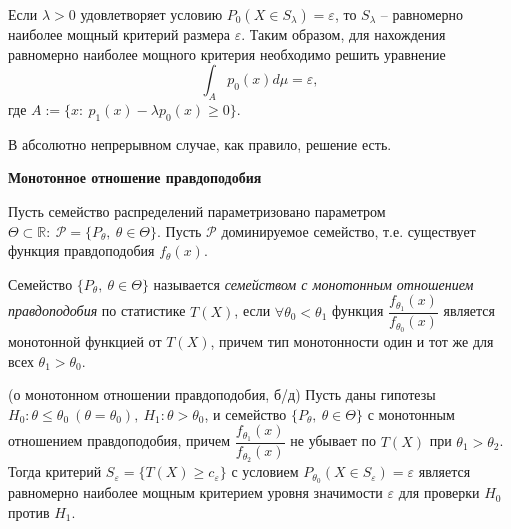 \begin{corollary}
    Если $\displaystyle \lambda  >0$ удовлетворяет условию $\displaystyle P_{0}( X\in S_{\lambda }) =\varepsilon $, то $\displaystyle S_{\lambda }$ -- равномерно наиболее мощный критерий размера $\displaystyle \varepsilon $. Таким образом, для нахождения равномерно наиболее мощного критерия необходимо решить уравнение
    \begin{equation*}
        \int _{A} p_{0}( x) d\mu =\varepsilon ,
    \end{equation*}
    где $\displaystyle A:=\{x:\ p_{1}( x) -\lambda p_{0}( x) \geqslant 0\}$.
\end{corollary}
\begin{note}
    В абсолютно непрерывном случае, как правило, решение есть.
\end{note}


\textbf{Монотонное отношение правдоподобия}


Пусть семейство распределений параметризовано параметром $\displaystyle \Theta \subset \mathbb{R} :\ \mathcal{P} =\{P_{\theta } ,\ \theta \in \Theta \}$. Пусть $\displaystyle \mathcal{P}$ доминируемое семейство, т.е. существует функция правдоподобия $\displaystyle f_{\theta }( x)$.
\begin{definition}
    Семейство $\displaystyle \{P_{\theta } ,\ \theta \in \Theta \}$ называется \textit{семейством с монотонным отношением правдоподобия} по статистике $\displaystyle T( X)$, если $\displaystyle \forall \theta _{0} < \theta _{1}$ функция $\displaystyle \dfrac{f_{\theta _{1}}( x)}{f_{\theta _{0}}( x)}$ является монотонной функцией от $\displaystyle T( X)$, причем тип монотонности один и тот же для всех $\displaystyle \theta _{1}  >\theta _{0}$.
\end{definition}
\begin{theorem}
    (о монотонном отношении правдоподобия, б/д) Пусть даны гипотезы $\displaystyle H_{0} :\theta \leqslant \theta _{0} \ ( \theta =\theta _{0}) ,\ H_{1} :\theta  >\theta _{0}$, и семейство $\displaystyle \{P_{\theta } ,\ \theta \in \Theta \}$ с монотонным отношением правдоподобия, причем $\displaystyle \dfrac{f_{\theta _{1}}( x)}{f_{\theta _{2}}( x)}$ не убывает по $\displaystyle T( X)$ при $\displaystyle \theta _{1}  >\theta _{2}$. Тогда критерий $\displaystyle S_{\varepsilon } =\{T( X) \geqslant c_{\varepsilon }\}$ с условием $\displaystyle P_{\theta _{0}}( X\in S_{\varepsilon }) =\varepsilon $ является равномерно наиболее мощным критерием уровня значимости $\displaystyle \varepsilon $ для проверки $\displaystyle H_{0}$ против $\displaystyle H_{1}$.
\end{theorem}


